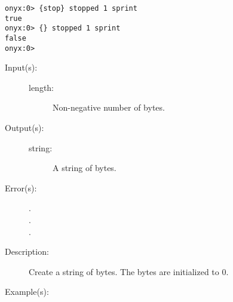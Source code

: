 \begin{description}
\begin{description}
\begin{verbatim}
onyx:0> {stop} stopped 1 sprint
true
onyx:0> {} stopped 1 sprint
false
onyx:0>
		\end{verbatim}
	\end{description}
\label{systemdict:string}
\item[{\onyxop{length}{string}{string}}: ]
	\begin{description}\item[]
	\item[Input(s): ]
		\begin{description}\item[]
		\item[length: ]
			Non-negative number of bytes.
		\end{description}
	\item[Output(s): ]
		\begin{description}\item[]
		\item[string: ]
			A string of  bytes.
		\end{description}
	\item[Error(s): ]
		\begin{description}\item[]
		\item[.]
		\item[.]
		\item[.]
		\end{description}
	\item[Description: ]
		Create a string of  bytes.  The bytes are
		initialized to 0.
	\item[Example(s): ]\begin{verbatim}


\end{verbatim}
\end{description}
\end{description}
